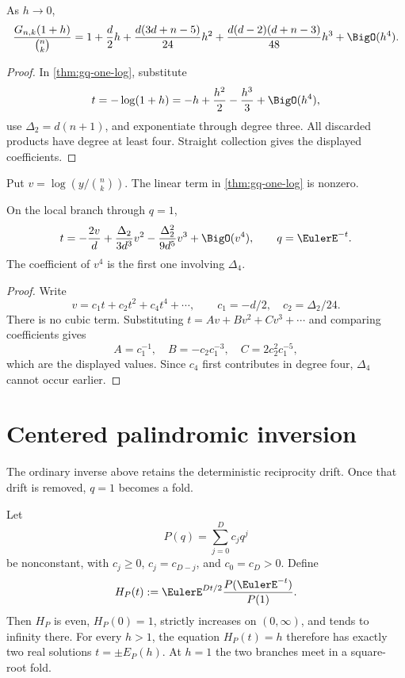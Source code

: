 \begin{corollary}[Literal Taylor coordinate \(h=q-1\)]
\label{cor:gq-one-h}
As \(h\to0\),
\[
  \frac{G_{n,k}(1+h)}{\binom nk}
  =1+\frac d2h
   +\frac{d(3d+n-5)}{24}h^2
   +\frac{d(d-2)(d+n-3)}{48}h^3
   +\BigO(h^4).
\]
\end{corollary}

\begin{proof}
In \cref{thm:gq-one-log}, substitute
\[
  t=-\log(1+h)=-h+\frac{h^2}{2}-\frac{h^3}{3}
  +\BigO(h^4),
\]
use \(\Delta_2=d(n+1)\), and exponentiate through degree three.
All discarded products have degree at least four.  Straight collection gives
the displayed coefficients.
\end{proof}

Put \(v=\log(y/\binom nk)\).  The linear term in
\cref{thm:gq-one-log} is nonzero.

\begin{corollary}[Ordinary Gaussian inverse at \(q=1\)]
\label{cor:gq-one-inverse}
On the local branch through \(q=1\),
\[
  t=-\frac{2v}{d}
    +\frac{\Delta_2}{3d^3}v^2
    -\frac{\Delta_2^2}{9d^5}v^3
    +\BigO(v^4),
  \qquad q=\EulerE^{-t}.
\]
The coefficient of \(v^4\) is the first one involving \(\Delta_4\).
\end{corollary}

\begin{proof}
Write
\[
  v=c_1t+c_2t^2+c_4t^4+\cdots,
  \qquad c_1=-d/2,\quad c_2=\Delta_2/24.
\]
There is no cubic term.  Substituting
\(t=Av+Bv^2+Cv^3+\cdots\) and comparing coefficients gives
\[
  A=c_1^{-1},\quad
  B=-c_2c_1^{-3},\quad
  C=2c_2^2c_1^{-5},
\]
which are the displayed values.  Since \(c_4\) first contributes in degree
four, \(\Delta_4\) cannot occur earlier.
\end{proof}

\section{Centered palindromic inversion}
\label{sec:centered-palindromic}

The ordinary inverse above retains the deterministic reciprocity drift.  Once
that drift is removed, \(q=1\) becomes a fold.

\begin{theorem}
\label{thm:gq-centered-palindromic}
Let
\[
  P(q)=\sum_{j=0}^{D}c_jq^j
\]
be nonconstant, with \(c_j\ge0\), \(c_j=c_{D-j}\), and
\(c_0=c_D>0\).  Define
\[
  H_P(t):=\EulerE^{Dt/2}\frac{P(\EulerE^{-t})}{P(1)}.
\]
Then \(H_P\) is even, \(H_P(0)=1\), strictly increases on
\((0,\infty)\), and tends to infinity there.  For every \(h>1\), the equation
\(H_P(t)=h\) therefore has exactly two real solutions
\(t=\pm E_P(h)\).  At \(h=1\) the two branches meet in a square-root fold.
\end{theorem}

